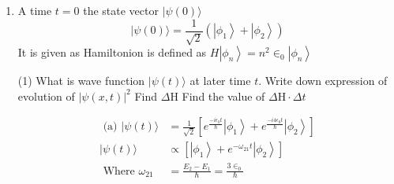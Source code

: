 \begin{enumerate}
\begin{answer}
\begin{align*}
		&=2 \hbar \omega \times \frac{2}{3}+3 \hbar \omega \times \frac{1}{3} \quad\langle H\rangle=\frac{7 \hbar \omega}{3}\\
		\left\langle H^{2}\right\rangle&=\frac{\left\langle\psi\left|H^{2}\right| \psi\right\rangle}{\langle\psi \mid \psi\rangle}=\Sigma P_{n}\left(a_{n}\right) a_{n}^{2}=\frac{2}{3} \times(2 \hbar \omega)^{2}+\frac{1}{3} \times(3 \hbar \omega)^{2}\\&=\frac{8 \hbar^{2} \omega^{2}}{3}+\frac{9 \hbar^{2} \omega^{2}}{3}=\frac{17 \hbar^{2} \omega^{2}}{3}
	\end{align*}
	(d)The error in measurement in $\mathrm{H}$ is given as
	\begin{align*}
	\Delta H=\sqrt{\left\langle H^{2}\right\rangle-\langle H\rangle^{2}} & \left\langle H^{2}\right\rangle=\frac{17 \hbar^{2} \omega^{2}}{3} \\
	\langle H\rangle^{2}=\left(\frac{7 \hbar \omega}{3}\right)^{2}=\frac{49 \hbar^{2} \omega^{2}}{9} & \Delta H=\sqrt{\frac{17}{3}-\frac{49}{9}} \hbar \omega\\
	\Delta H&=\sqrt{\frac{51-49}{9}} \hbar \omega=\frac{\sqrt{2}}{3} \hbar \omega
	\end{align*}
\end{answer}
	\item  A time $t=0$ the state vector $|\psi(0)\rangle$
	$$
	|\psi(0)\rangle=\frac{1}{\sqrt{2}}\left(\left|\phi_{1}\right\rangle+\left|\phi_{2}\right\rangle\right)
	$$
	It is given as Hamiltonion is defined as $H\left|\phi_{n}\right\rangle=n^{2} \in_{0}\left|\phi_{n}\right\rangle$
	 \begin{tasks}(1)
		\task[\text{a)}] What is wave function $|\psi(t)\rangle$ at later time $t$.
		\task[\text{b)}]Write down expression of evolution of $|\psi(x, t)|^{2}$
		\task[\text{c)}]Find $\Delta \mathrm{H}$
		\task[\text{d)}] Find the value of $\Delta \mathrm{H} \cdot \Delta t$
	\end{tasks}
\begin{answer}
	\begin{align*}
	\text { (a) }|\psi(t)\rangle&=\frac{1}{\sqrt{2}}\left[e^{\frac{-i \epsilon_{0} t}{\hbar}}\left|\phi_{1}\right\rangle+e^{\frac{-i 4 \epsilon_{0} t}{\hbar}}\left|\phi_{2}\right\rangle\right]\\
	|\psi(t)\rangle &\propto\left[\left|\phi_{1}\right\rangle+e^{-\omega_{21} t}\left|\phi_{2}\right\rangle\right]\\
	\text { Where } \omega_{21}&=\frac{E_{2}-E_{1}}{\hbar}=\frac{3 \in_{0}}{\hbar}
	\end{align*}

\end{answer}
\end{enumerate}
